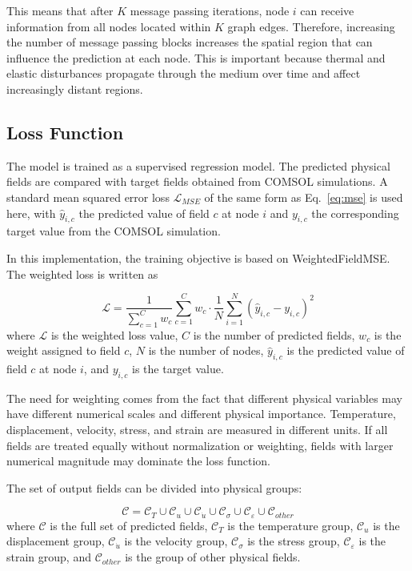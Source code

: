 This means that after \(K\) message passing iterations, node \(i\) can receive information from all nodes located within \(K\) graph edges. Therefore, increasing the number of message passing blocks increases the spatial region that can influence the prediction at each node. This is important because thermal and elastic disturbances propagate through the medium over time and affect increasingly distant regions.

\subsection{Loss Function}

The model is trained as a supervised regression model. The predicted physical fields are compared with target fields obtained from COMSOL simulations. A standard mean squared error loss \(\mathcal{L}_{MSE}\) of the same form as Eq.~\eqref{eq:mse} is used here, with \(\hat{y}_{i,c}\) the predicted value of field \(c\) at node \(i\) and \(y_{i,c}\) the corresponding target value from the COMSOL simulation.

In this implementation, the training objective is based on WeightedFieldMSE. The weighted loss is written as

\begin{equation}
\mathcal{L}
=
\frac{1}{\sum_{c=1}^{C} w_c}
\sum_{c=1}^{C}
w_c
\cdot
\frac{1}{N}
\sum_{i=1}^{N}
\left(
\hat{y}_{i,c}
-
y_{i,c}
\right)^2
\end{equation}
where \(\mathcal{L}\) is the weighted loss value, \(C\) is the number of predicted fields, \(w_c\) is the weight assigned to field \(c\), \(N\) is the number of nodes, \(\hat{y}_{i,c}\) is the predicted value of field \(c\) at node \(i\), and \(y_{i,c}\) is the target value.

The need for weighting comes from the fact that different physical variables may have different numerical scales and different physical importance. Temperature, displacement, velocity, stress, and strain are measured in different units. If all fields are treated equally without normalization or weighting, fields with larger numerical magnitude may dominate the loss function.

The set of output fields can be divided into physical groups:

\begin{equation}
\mathcal{C}
=
\mathcal{C}_{T}
\cup
\mathcal{C}_{u}
\cup
\mathcal{C}_{\dot{u}}
\cup
\mathcal{C}_{\sigma}
\cup
\mathcal{C}_{\varepsilon}
\cup
\mathcal{C}_{other}
\end{equation}
where \(\mathcal{C}\) is the full set of predicted fields, \(\mathcal{C}_{T}\) is the temperature group, \(\mathcal{C}_{u}\) is the displacement group, \(\mathcal{C}_{\dot{u}}\) is the velocity group, \(\mathcal{C}_{\sigma}\) is the stress group, \(\mathcal{C}_{\varepsilon}\) is the strain group, and \(\mathcal{C}_{other}\) is the group of other physical fields.


